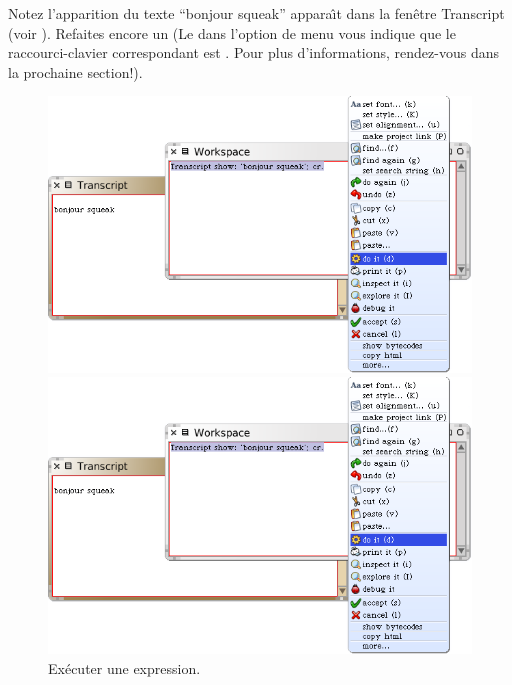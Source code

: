 \documentclass[a4paper,10pt,twoside]{book}
\begin{document}
Notez l'apparition du texte ``bonjour squeak'' appara\^{\i}t dans la
fen\^etre Transcript (voir ).
Refaites encore un 
(Le  dans l'option de menu  vous indique que
le raccourci-clavier correspondant est . Pour plus
d'informations, rendez-vous dans la prochaine section!).

\begin{figure}[htb]
\ifluluelse
	{\centerline {\includegraphics[width=\textwidth]{Doit}}}
	{\centerline {\includegraphics[scale=0.7]{Doit}}}
\caption{Ex\'ecuter une expression.\label{fig:doit}}
\end{figure}
\end{document}
